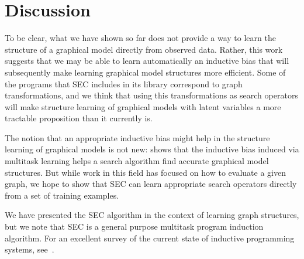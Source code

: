 \documentclass{article} %
\begin{document}
\section{Discussion}

To be clear, what we have shown so far does not provide a way to learn the structure of a graphical model directly from observed data. Rather, this work suggests that we may be able to learn automatically an inductive bias that will subsequently make learning graphical model structures more efficient. Some of the programs that SEC includes in its library correspond to graph transformations, and we think that using this transformations as search operators will make structure learning of graphical models with latent variables a more tractable proposition than it currently is. 

The notion that an appropriate inductive bias might help in the structure learning of graphical models is not new: \citep{DBLP:conf/icml/HonorioS10} shows that the inductive bias induced via multitask learning helps a search algorithm find accurate graphical model structures. But while work in this field has focused on how to evaluate a given graph, we hope to show that SEC can learn appropriate search operators directly from a set of training examples. 

We have presented the SEC algorithm in the context of learning graph structures, but we note that SEC is a general purpose multitask program induction algorithm. For an excellent survey of the current state of inductive programming systems, see~\citep{DBLP:conf/aaip/Kitzelmann09}. 



\end{document}
